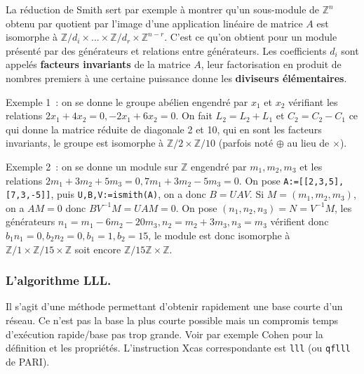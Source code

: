 \documentclass[a4paper,11pt]{article}
\newcommand{\Z}{{\mathbb{Z}}}
\begin{document}
\begin{giacjshere}
La r\'eduction de Smith sert par exemple \`a montrer
qu'un sous-module de $\Z^n$ obtenu par quotient par l'image 
d'une application lin\'eaire de matrice $A$ est isomorphe 
\`a $\Z/d_i \times ... \times \Z/d_r \times \Z^{n-r}$. C'est ce
qu'on obtient pour un module pr\'esent\'e par des g\'en\'erateurs
et relations entre g\'en\'erateurs.
Les coefficients $d_i$ sont appel\'es {\bf facteurs
invariants} de la
matrice $A$, leur factorisation en produit de nombres 
premiers \`a une certaine puissance donne les {\bf diviseurs 
\'el\'ementaires}.

Exemple 1~: on se donne le groupe ab\'elien engendr\'e par $x_1$ et
$x_2$ v\'erifiant les relations $2x_1+4x_2=0, -2x_1+6x_2=0$. On fait
$L_2=L_2+L_1$ et $C_2=C_2-C_1$ ce qui donne la matrice r\'eduite
de diagonale 2 et 10, qui en sont les facteurs invariants, le groupe
est isomorphe \`a $\Z/2 \times \Z/10$ (parfois not\'e 
$\oplus$ au lieu de $\times$).

Exemple 2~: on se donne un module sur $\Z$ engendr\'e par $m_1,m_2,m_3$
et les relations $2m_1+3m_2+5m_3=0, 7m_1+3m_2-5m_3=0$.
On pose \verb|A:=[[2,3,5],[7,3,-5]]|, puis
\verb|U,B,V:=ismith(A)|, on a donc $B=UAV$.
Si $M=(m_1,m_2,m_3)$, on a $AM=0$ donc $B V^{-1}M=UAM=0$.
On pose $(n_1,n_2,n_3)=N=V^{-1}M$, 
les g\'en\'erateurs $n_1=m_1-6m_2-20m_3, n_2=m_2+3m_3,n_3=m_3$
v\'erifient donc $b_1 n_1=0, b_2n_2=0, b_1=1, b_2=15$, le module est donc
isomorphe \`a  $\Z/1 \times \Z/15 \times \Z$ soit encore $\Z/15\Z
\times \Z$.

\subsubsection{L'algorithme LLL.} 
Il s'agit d'une m\'ethode permettant d'obtenir rapidement
une base courte d'un r\'eseau. Ce n'est pas la base la plus courte
possible mais un compromis temps d'ex\'ecution rapide/base
pas trop grande. Voir par exemple Cohen pour la d\'efinition
et les propri\'et\'es. L'instruction Xcas correspondante est
\verb|lll| (ou \verb|qflll| de PARI).


\end{giacjshere}
\end{document}
